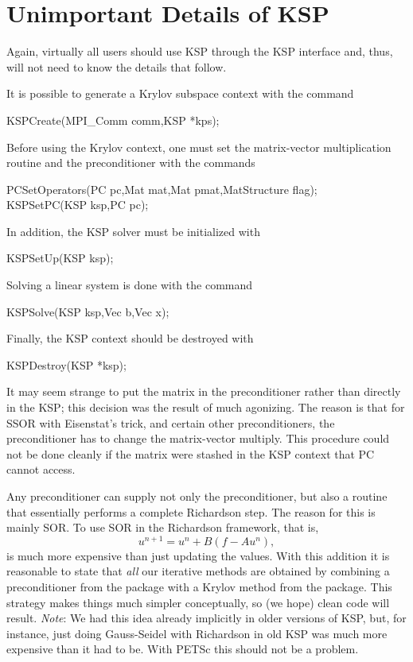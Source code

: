{{{\section{Unimportant Details of KSP}

Again, virtually all users should use KSP through the KSP interface
and, thus, will not need to know the details that follow. 

It is possible to generate a Krylov subspace context with the 
command 
\begin{tabbing}
  KSPCreate(MPI\_Comm comm,KSP *kps);
\end{tabbing}
Before using the Krylov context, one must set the matrix-vector multiplication routine and
the preconditioner with the 
commands
\begin{tabbing}
  PCSetOperators(PC pc,Mat mat,Mat pmat,MatStructure flag);\\
  KSPSetPC(KSP ksp,PC pc);
\end{tabbing}
In addition, the KSP solver must be initialized with
\begin{tabbing}
  KSPSetUp(KSP ksp);
\end{tabbing}
Solving a linear system is done with the command
\begin{tabbing}
  KSPSolve(KSP ksp,Vec b,Vec x);
\end{tabbing}
Finally, the KSP context should be destroyed with
\begin{tabbing}
  KSPDestroy(KSP *ksp);
\end{tabbing}

It may seem strange to put the matrix in the preconditioner rather
than directly in the KSP; this decision was the result of much
agonizing. The reason is that for SSOR with Eisenstat's trick, and 
certain other preconditioners, the
preconditioner has to change the matrix-vector multiply.  This 
procedure could not
be done cleanly if the matrix were stashed in the KSP context that
PC cannot access.

Any preconditioner can supply not 
only the preconditioner, but also a routine that essentially performs a
complete Richardson step. The reason for this is mainly SOR. To 
use SOR in the Richardson framework, that is,
\[
  u^{n+1} = u^{n} + B(f - A u^{n}), 
\]
is much more expensive than just updating the values.
With this addition it is reasonable to state that {\em all} our
iterative methods are obtained by combining a preconditioner from 
the  package with a Krylov method from the 
package. This strategy makes things much simpler conceptually, so 
(we hope)
clean code will result. {\em Note}: We had this idea already implicitly in 
older versions of KSP, but, for instance, just doing Gauss-Seidel
with Richardson in old KSP was much more expensive than it had to be. 
With PETSc this should not be a problem. 

}}}
